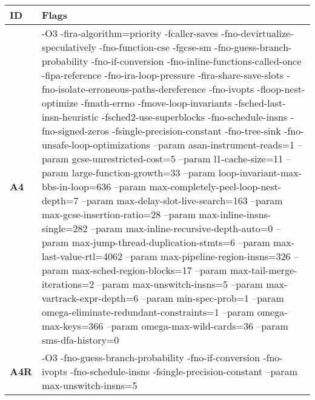     \begin{tabular}{|l|p{6.2in}|}
     \hline
      \textbf{ID} & \textbf{Flags} \\ 
     \hline
      \textbf{ A4 } & {\small -O3 -fira-algorithm=priority -fcaller-saves -fno-devirtualize-speculatively -fno-function-cse -fgcse-sm -fno-guess-branch-probability -fno-if-conversion -fno-inline-functions-called-once -fipa-reference -fno-ira-loop-pressure -fira-share-save-slots -fno-isolate-erroneous-paths-dereference -fno-ivopts -floop-nest-optimize -fmath-errno -fmove-loop-invariants -fsched-last-insn-heuristic -fsched2-use-superblocks -fno-schedule-insns -fno-signed-zeros -fsingle-precision-constant -fno-tree-sink -fno-unsafe-loop-optimizations --param asan-instrument-reads=1 --param gcse-unrestricted-cost=5 --param l1-cache-size=11 --param large-function-growth=33 --param loop-invariant-max-bbs-in-loop=636 --param max-completely-peel-loop-nest-depth=7 --param max-delay-slot-live-search=163 --param max-gcse-insertion-ratio=28 --param max-inline-insns-single=282 --param max-inline-recursive-depth-auto=0 --param max-jump-thread-duplication-stmts=6 --param max-last-value-rtl=4062 --param max-pipeline-region-insns=326 --param max-sched-region-blocks=17 --param max-tail-merge-iterations=2 --param max-unswitch-insns=5 --param max-vartrack-expr-depth=6 --param min-spec-prob=1 --param omega-eliminate-redundant-constraints=1 --param omega-max-keys=366 --param omega-max-wild-cards=36 --param sms-dfa-history=0 }\\
     \hline
      \textbf{ A4R } & {\small -O3 -fno-guess-branch-probability -fno-if-conversion -fno-ivopts -fno-schedule-insns -fsingle-precision-constant --param max-unswitch-insns=5 }\\
     \hline
    \end{tabular}    